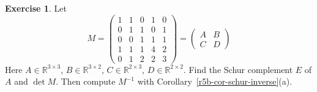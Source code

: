 \documentclass[12pt]{article}
\newcommand{\R}{\mathbb R}
\theoremstyle{definition}
\newtheorem{exercise}{Exercise}
\begin{document}
\begin{exercise}\label{r5b-ex-partitioned-inverse-drill}
Let
\[
M=\left(\begin{array}{ccc|cc}1&1&0&1&0\\0&1&1&0&1\\0&0&1&1&1\\\hline1&1&1&4&2\\0&1&2&2&3\end{array}\right)
=\begin{pmatrix}A&B\\C&D\end{pmatrix}
\]
Here \(A\in\R^{3\times3}\), \(B\in\R^{3\times2}\), \(C\in\R^{2\times3}\), \(D\in\R^{2\times2}\).
Find the Schur complement \(E\) of \(A\) and \(\det M\). Then compute \(M^{-1}\) with
Corollary~\ref{r5b-cor-schur-inverse}(a).
\end{exercise}
\end{document}
